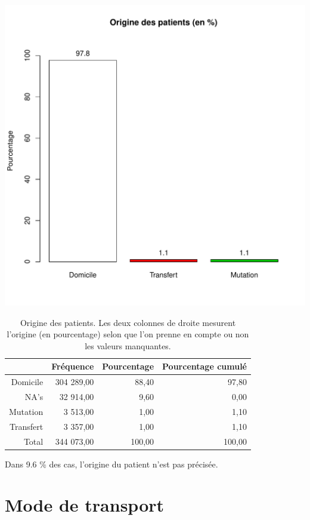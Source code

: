 \documentclass[12pt,english,french,twoside]{book}\usepackage[]{graphicx}\usepackage[]{color}
\makeatletter
\def\maxwidth{ %
  \ifdim\Gin@nat@width>\linewidth
    \linewidth
  \else
    \Gin@nat@width
  \fi
}
\makeatother
\begin{document}
\includegraphics[width=\maxwidth]{figure/mode_entree-1} 
\begin{table}[ht]
\centering
\begin{tabular}{rrrr}
  \hline
 & Fréquence & Pourcentage & Pourcentage cumulé \\ 
  \hline
Domicile & 304 289,00 & 88,40 & 97,80 \\ 
  NA's & 32 914,00 & 9,60 & 0,00 \\ 
  Mutation & 3 513,00 & 1,00 & 1,10 \\ 
  Transfert & 3 357,00 & 1,00 & 1,10 \\ 
    Total & 344 073,00 & 100,00 & 100,00 \\ 
   \hline
\end{tabular}
\caption[Origine des patients]{Origine des patients. Les deux colonnes de droite mesurent l'origine (en pourcentage) selon que l'on prenne en compte ou non les valeurs manquantes. } 
\label{origine}
\end{table}


Dans 9.6 \% des cas, l'origine du patient n'est pas précisée.

\section*{Mode de transport}
\end{document}
